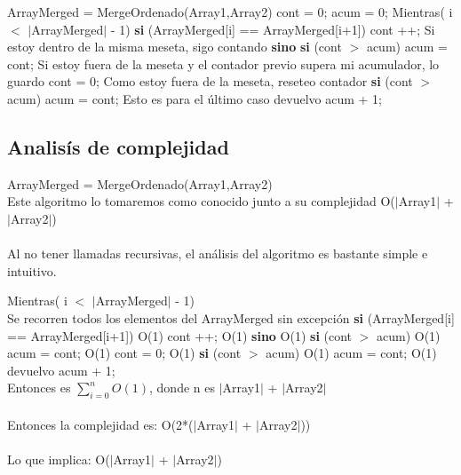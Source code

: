 \begin{codebox}
\li	ArrayMerged = MergeOrdenado(Array1,Array2)
\li     cont = 0;	
\li     acum = 0;
\li     Mientras( i $<$ $|$ArrayMerged$|$ - 1) \Do
\li          \textbf{si} (ArrayMerged[i] == ArrayMerged[i+1]) \Do
\li             cont ++; \RComment Si estoy dentro de la misma meseta, sigo contando
\End
\li 	     \textbf{sino}  \Do
\li 	     \textbf{si} (cont $>$ acum) \Do
\li		acum = cont; \RComment Si estoy fuera de la meseta y el contador previo supera mi acumulador, lo guardo
\End
\li 	     cont = 0; \RComment Como estoy fuera de la meseta, reseteo contador
\End
\End
\li 	     \textbf{si} (cont $>$ acum) \Do
\li		acum = cont; \RComment Esto es para el último caso
\End
\li	     devuelvo acum + 1;

\end{codebox}


\subsection{Analisís de complejidad}

\begin{codebox}
\li	ArrayMerged = MergeOrdenado(Array1,Array2) \\
Este algoritmo lo tomaremos como conocido junto a su complejidad O($|$Array1$|$ + $|$Array2$|$)\\
\\

Al no tener llamadas recursivas, el análisis del algoritmo es bastante simple e intuitivo.

\li     Mientras( i $<$ $|$ArrayMerged$|$ - 1) \Do \\
Se recorren todos los elementos del ArrayMerged sin excepción
\li          \textbf{si} (ArrayMerged[i] == ArrayMerged[i+1]) \Do \RComment O(1)
\li             cont ++; \RComment O(1)
\End
\li 	     \textbf{sino}  \Do \RComment O(1)
\li 	     \textbf{si} (cont $>$ acum) \Do \RComment O(1)
\li		acum = cont; \RComment \RComment O(1)
\End
\li 	     cont = 0; \RComment O(1)
\End
\End
\li 	     \textbf{si} (cont $>$ acum) \Do \RComment O(1)
\li		acum = cont; \RComment O(1)
\End
\li	     devuelvo acum + 1;
\\
Entonces es $\sum\limits_{i=0}^n O(1)$, donde n es $|$Array1$|$ + $|$Array2$|$ \\
\\
Entonces la complejidad es: O(2*($|$Array1$|$ + $|$Array2$|$))\\
\\
Lo que implica: O($|$Array1$|$ + $|$Array2$|$)\\

\end{codebox}





